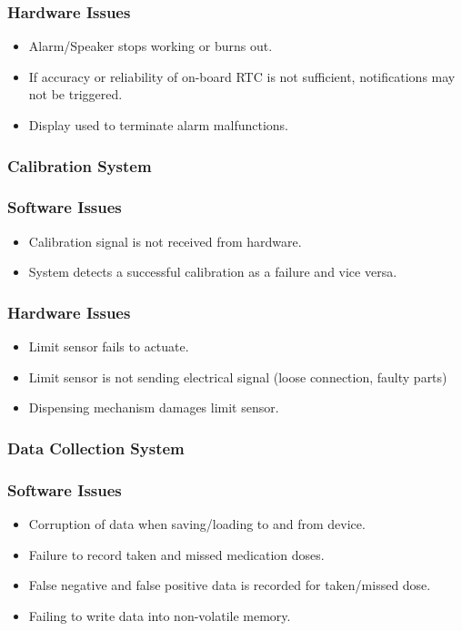 \documentclass[12pt]{article}
\begin{document}
\subsubsection*{Hardware Issues}
\begin{itemize}
\item Alarm/Speaker stops working or burns out.
\item If accuracy or reliability of on-board RTC is not sufficient, notifications may not be triggered.
\item Display used to terminate alarm malfunctions.
\end{itemize}

\subsubsection{Calibration System}
\subsubsection*{Software Issues}
\begin{itemize}
\item Calibration signal is not received from hardware.
\item System detects a successful calibration as a failure and vice versa.
\end{itemize}
\subsubsection*{Hardware Issues}
\begin{itemize}
\item Limit sensor fails to actuate.
\item Limit sensor is not sending electrical signal (loose connection, faulty parts)
\item Dispensing mechanism damages limit sensor.
\end{itemize}

\subsubsection{Data Collection System}
\subsubsection*{Software Issues}
\begin{itemize}
\item Corruption of data when saving/loading to and from device.
\item Failure to record taken and missed medication doses.
\item False negative and false positive data is recorded for taken/missed dose.
\item Failing to write data into non-volatile memory.
\end{itemize}
\end{document}
